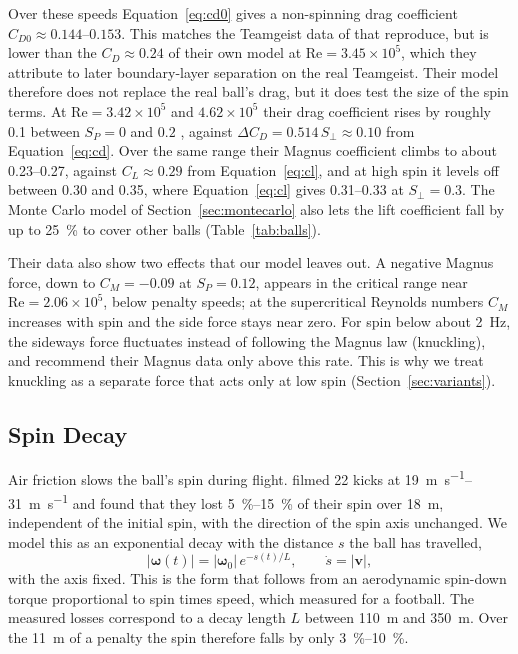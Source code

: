 \documentclass[10pt,a4paper]{article}
\begin{document}
Over these speeds Equation~\eqref{eq:cd0} gives a non-spinning drag
coefficient $C_{D0} \approx 0.144$--$0.153$. This matches the Teamgeist data
of \citet{asai2007} that \citet[Fig.~2]{kray2014} reproduce, but is lower than
the $C_D \approx 0.24$ of their own model at $\mathrm{Re} = 3.45\times10^5$,
which they attribute to later boundary-layer separation on the real
Teamgeist. Their model therefore does not replace the real ball's drag, but it
does test the size of the spin terms. At $\mathrm{Re} = 3.42\times10^5$ and
$4.62\times10^5$ their drag coefficient rises by roughly 0.1 between
$S_P = 0$ and $0.2$ \citep[Fig.~9]{kray2014}, against
$\Delta C_D = 0.514\,S_\perp \approx 0.10$ from Equation~\eqref{eq:cd}. Over
the same range their Magnus coefficient climbs to about 0.23--0.27, against
$C_L \approx 0.29$ from Equation~\eqref{eq:cl}, and at high spin it levels off
between 0.30 and 0.35, where Equation~\eqref{eq:cl} gives 0.31--0.33 at
$S_\perp = 0.3$. The Monte Carlo model of Section~\ref{sec:montecarlo} also
lets the lift coefficient fall by up to \SI{25}{\percent} to cover other balls
(Table~\ref{tab:balls}).

Their data also show two effects that our model leaves out. A negative Magnus
force, down to $C_M = -0.09$ at $S_P = 0.12$, appears in the critical range
near $\mathrm{Re} = 2.06\times10^5$, below penalty speeds; at the
supercritical Reynolds numbers $C_M$ increases with spin and the side force
stays near zero. For spin below about \SI{2}{\hertz}, the sideways force
fluctuates instead of following the Magnus law (knuckling), and
\citet{kray2014} recommend their Magnus data only above this rate. This is why
we treat knuckling as a separate force that acts only at low spin
(Section~\ref{sec:variants}).

\subsection{Spin Decay}
\label{sec:spin-decay}

Air friction slows the ball's spin during flight. \citet{tsukada2008} filmed
22 kicks at \SIrange{19}{31}{\metre\per\second} and found that they lost
\SIrange{5}{15}{\percent} of their spin over \SI{18}{\metre}, independent of
the initial spin, with the direction of the spin axis unchanged. We model this
as an exponential decay with the distance $s$ the ball has travelled,
\begin{equation}
  |\bm{\omega}(t)| = |\bm{\omega}_0|\, e^{-s(t)/L}, \qquad \dot{s} = |\bm{v}|,
  \label{eq:spindecay}
\end{equation}
with the axis fixed. This is the form that follows from an aerodynamic
spin-down torque proportional to spin times speed, which
\citet{james2008} measured for a football. The measured losses correspond to a decay
length $L$ between \SI{110}{\metre} and \SI{350}{\metre}. Over the
\SI{11}{\metre} of a penalty the spin therefore falls by only
\SIrange{3}{10}{\percent}.
\end{document}

